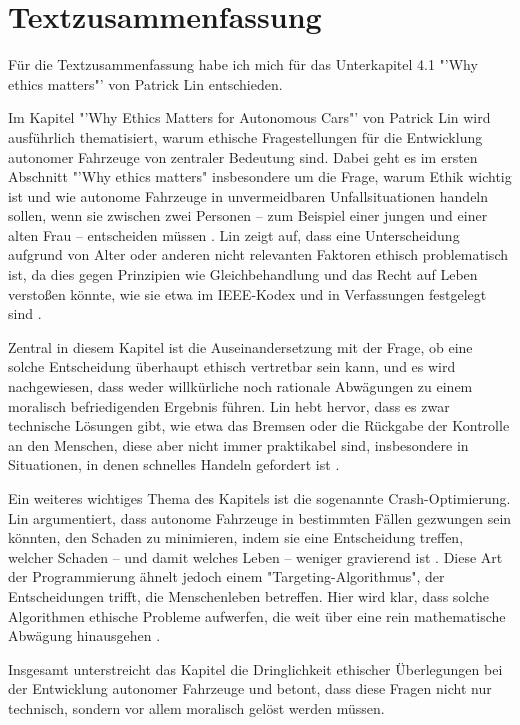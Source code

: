 \chapter{Textzusammenfassung} \label{ch:textzusammenfassung}

Für die Textzusammenfassung habe ich mich für das Unterkapitel 4.1 "'Why ethics matters"' von Patrick Lin \cite[S. 69ff.]{maurer_autonomes_2015}  entschieden.

Im Kapitel "'Why Ethics Matters for Autonomous Cars"' von Patrick Lin wird ausführlich thematisiert, warum ethische Fragestellungen für die Entwicklung autonomer Fahrzeuge von zentraler Bedeutung sind. Dabei geht es im ersten Abschnitt "'Why ethics matters" insbesondere um die Frage, warum Ethik wichtig ist und wie autonome Fahrzeuge in unvermeidbaren Unfallsituationen handeln sollen, wenn sie zwischen zwei Personen – zum Beispiel einer jungen und einer alten Frau – entscheiden müssen \cite[S. 70]{maurer_autonomes_2015}. Lin zeigt auf, dass eine Unterscheidung aufgrund von Alter oder anderen nicht relevanten Faktoren ethisch problematisch ist, da dies gegen Prinzipien wie Gleichbehandlung und das Recht auf Leben verstoßen könnte, wie sie etwa im IEEE-Kodex und in Verfassungen festgelegt sind \cite[S. 70f.]{maurer_autonomes_2015}.

Zentral in diesem Kapitel ist die Auseinandersetzung mit der Frage, ob eine solche Entscheidung überhaupt ethisch vertretbar sein kann, und es wird nachgewiesen, dass weder willkürliche noch rationale Abwägungen zu einem moralisch befriedigenden Ergebnis führen. Lin hebt hervor, dass es zwar technische Lösungen gibt, wie etwa das Bremsen oder die Rückgabe der Kontrolle an den Menschen, diese aber nicht immer praktikabel sind, insbesondere in Situationen, in denen schnelles Handeln gefordert ist \cite[S. 71]{maurer_autonomes_2015}.

Ein weiteres wichtiges Thema des Kapitels ist die sogenannte Crash-Optimierung. Lin argumentiert, dass autonome Fahrzeuge in bestimmten Fällen gezwungen sein könnten, den Schaden zu minimieren, indem sie eine Entscheidung treffen, welcher Schaden – und damit welches Leben – weniger gravierend ist \cite[S. 72]{maurer_autonomes_2015}. Diese Art der Programmierung ähnelt jedoch einem "Targeting-Algorithmus", der Entscheidungen trifft, die Menschenleben betreffen. Hier wird klar, dass solche Algorithmen ethische Probleme aufwerfen, die weit über eine rein mathematische Abwägung hinausgehen \cite[S. 72f.]{maurer_autonomes_2015}.

Insgesamt unterstreicht das Kapitel die Dringlichkeit ethischer Überlegungen bei der Entwicklung autonomer Fahrzeuge und betont, dass diese Fragen nicht nur technisch, sondern vor allem moralisch gelöst werden müssen.